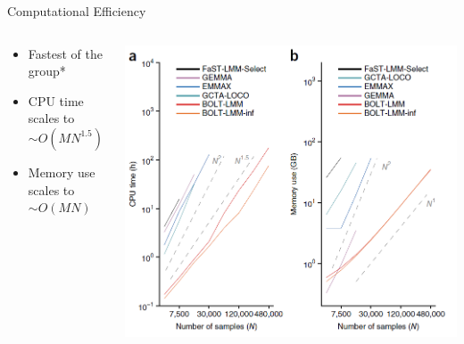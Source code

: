 \documentclass[aspectratio=169]{beamer}\usepackage[]{graphicx}\usepackage[]{color}
\begin{document}
\begin{frame}{Computational Efficiency}
\begin{columns}[onlytextwidth]
\begin{column}{0.5\textwidth}
\begin{itemize}
\item Fastest of the group*
\item CPU time scales to $\sim O(MN^{1.5})$
\item Memory use scales to $\sim O(MN)$
\end{itemize}
\end{column}
\begin{column}{0.5\textwidth}
\includegraphics[scale=.3]{./figure/CompTimeFig.png}
\end{column}
\end{columns}
\end{frame}
\end{document}
